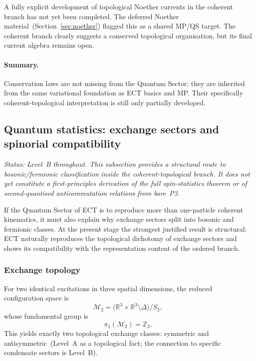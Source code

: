 \documentclass[11pt,a4paper]{article}
\numberwithin{equation}{section}
\begin{document}
A fully explicit development of topological Noether currents in the
coherent branch has not yet been completed.
The deferred Noether material~(Section~\ref{sec:noether}) flagged this
as a shared MP/QS target.
The coherent branch clearly suggests a conserved topological
organisation, but its final current algebra remains open.

\paragraph{Summary.}
Conservation laws are not missing from the Quantum Sector; they are
inherited from the same variational foundation as ECT basics and MP.
Their specifically coherent-topological interpretation is still only
partially developed.

\subsection{Quantum statistics: exchange sectors and spinorial compatibility}
\label{sec:qs_statistics}

\textit{Status: Level~B throughout.
This subsection provides a structural route to bosonic/fermionic
classification inside the coherent-topological branch.
It does not yet constitute a first-principles derivation of the full
spin-statistics theorem or of second-quantised anticommutation
relations from bare~P3.}

\medskip
If the Quantum Sector of ECT is to reproduce more than one-particle
coherent kinematics, it must also explain why exchange sectors split
into bosonic and fermionic classes.
At the present stage the strongest justified result is structural: ECT
naturally reproduces the topological dichotomy of exchange sectors and
shows its compatibility with the representation content of the ordered
branch.

\subsubsection*{Exchange topology}

For two identical excitations in three spatial dimensions, the reduced
configuration space is
\begin{equation}
  \label{eq:qs_exchange_space}
  \mathcal{M}_2
  =
  \bigl(\mathbb{R}^3\times\mathbb{R}^3\setminus\Delta\bigr)/S_2,
\end{equation}
whose fundamental group is
\begin{equation}
  \label{eq:qs_exchange_pi1}
  \pi_1(\mathcal{M}_2) = \mathbb{Z}_2.
\end{equation}
This yields exactly two topological exchange classes: symmetric and
antisymmetric~(Level~A as a topological fact; the connection to
specific condensate sectors is Level~B).
\end{document}
